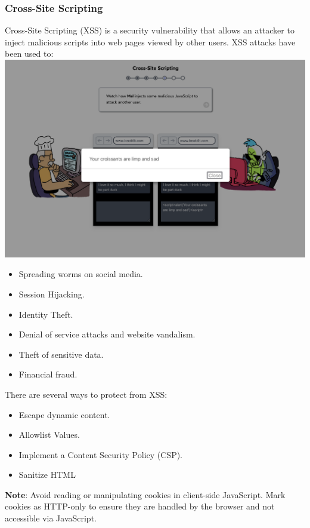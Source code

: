 \documentclass[12pt]{article}
\newcommand{\note}[1]{\textbf{#1}} %
\begin{document}
\subsubsection{Cross-Site Scripting}
Cross-Site Scripting (XSS) is a security vulnerability that allows an attacker to inject malicious scripts into web pages viewed by other users. XSS attacks have been used to:
\includegraphics[width=.7\textwidth]{Image17.png}
\begin{itemize}
    \item Spreading worms on social media.
    \item Session Hijacking.
    \item Identity Theft.
    \item Denial of service attacks and website vandalism.
    \item Theft of sensitive data.
    \item Financial fraud.
\end{itemize}
There are several ways to protect from XSS:

\begin{itemize}
    \item Escape dynamic content.
    \item Allowlist Values.
    \item Implement a Content Security Policy (CSP).
    \item Sanitize HTML
\end{itemize}
\note{Note}: Avoid reading or manipulating cookies in client-side JavaScript. Mark cookies as HTTP-only to ensure they are handled by the browser and not accessible via JavaScript.

\newpage
\end{document}
